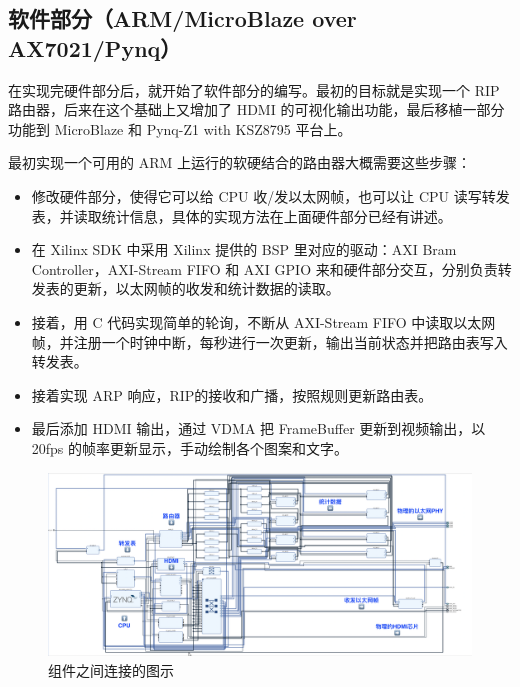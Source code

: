 \documentclass{ctexart}
\begin{document}
\subsection{软件部分（ARM/MicroBlaze over AX7021/Pynq）}
  在实现完硬件部分后，就开始了软件部分的编写。最初的目标就是实现一个 RIP 路由器，后来在这个基础上又增加了 HDMI 的可视化输出功能，最后移植一部分功能到 MicroBlaze 和 Pynq-Z1 with KSZ8795 平台上。

  最初实现一个可用的 ARM 上运行的软硬结合的路由器大概需要这些步骤：

  \begin{itemize}
    \item 修改硬件部分，使得它可以给 CPU 收/发以太网帧，也可以让 CPU 读写转发表，并读取统计信息，具体的实现方法在上面硬件部分已经有讲述。
    \item 在 Xilinx SDK 中采用 Xilinx 提供的 BSP 里对应的驱动：AXI Bram Controller，AXI-Stream FIFO 和 AXI GPIO 来和硬件部分交互，分别负责转发表的更新，以太网帧的收发和统计数据的读取。
    \item 接着，用 C 代码实现简单的轮询，不断从 AXI-Stream FIFO 中读取以太网帧，并注册一个时钟中断，每秒进行一次更新，输出当前状态并把路由表写入转发表。
    \item 接着实现 ARP 响应，RIP的接收和广播，按照规则更新路由表。
    \item 最后添加 HDMI 输出，通过 VDMA 把 FrameBuffer 更新到视频输出，以 20fps 的帧率更新显示，手动绘制各个图案和文字。
  \end{itemize}

  \begin{figure}[htbp]
    \includegraphics[width=\linewidth]{router.png}
    \caption{组件之间连接的图示}
  \end{figure}
\end{document}
